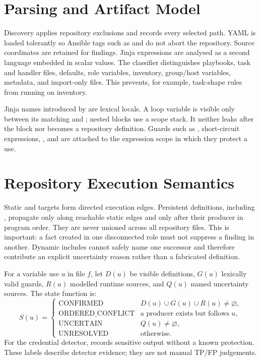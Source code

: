 \section{Parsing and Artifact Model}
Discovery applies repository exclusions and records every selected path. YAML
is loaded tolerantly so Ansible tags such as  and 
do not abort the repository. Source coordinates are retained for findings.
Jinja expressions are analysed as a second language embedded in scalar values.
The classifier distinguishes playbooks, task and handler files, defaults,
role variables, inventory, group/host variables, metadata, and import-only
files. This prevents, for example, task-shape rules from running on inventory.

Jinja names introduced by  are lexical locals. A loop variable is
visible only between its matching  and ; nested blocks
use a scope stack. It neither leaks after the block nor becomes a repository
definition. Guards such as , short-circuit expressions,
, and  are attached to the expression scope in which
they protect a use.

\section{Repository Execution Semantics}
Static  and  targets form directed
execution edges. Persistent definitions, including , propagate
only along reachable static edges and only after their producer in program
order. They are never unioned across all repository files. This is important:
a fact created in one disconnected role must not suppress a finding in another.
Dynamic includes cannot safely name one successor and therefore contribute an
explicit uncertainty reason rather than a fabricated definition.

For a variable use $u$ in file $f$, let $D(u)$ be visible definitions, $G(u)$
lexically valid guards, $R(u)$ modelled runtime sources, and $Q(u)$ named
uncertainty sources. The state function is:
\[
S(u)=
\begin{cases}
\mathrm{CONFIRMED} & D(u)\cup G(u)\cup R(u)\neq\varnothing,\\
\mathrm{ORDERED\_CONFLICT} & \text{a producer exists but follows }u,\\
\mathrm{UNCERTAIN} & Q(u)\neq\varnothing,\\
\mathrm{UNRESOLVED} & \text{otherwise.}
\end{cases}
\]
For the credential detector,  records sensitive output without a
known  protection. These labels describe detector evidence; they
are not manual TP/FP judgements.

